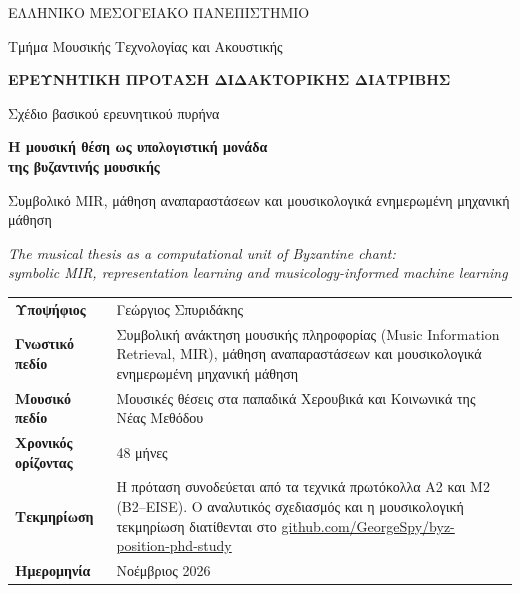 \documentclass[a4paper]{article}
\begin{document}
\fontsize{10.5}{12.6}\selectfont
\setlength{\parindent}{1em}

\hypersetup{pageanchor=false}
\begin{titlepage}
\centering
\vspace*{0.8cm}
{\sffamily\large ΕΛΛΗΝΙΚΟ ΜΕΣΟΓΕΙΑΚΟ ΠΑΝΕΠΙΣΤΗΜΙΟ\par}
{\sffamily Τμήμα Μουσικής Τεχνολογίας και Ακουστικής\par}
\vspace{1.7cm}
{\Large\bfseries\color{acc} ΕΡΕΥΝΗΤΙΚΗ ΠΡΟΤΑΣΗ ΔΙΔΑΚΤΟΡΙΚΗΣ ΔΙΑΤΡΙΒΗΣ\par}
\vspace{0.25cm}
{\large Σχέδιο βασικού ερευνητικού πυρήνα\par}
\vspace{1.1cm}
{\fontsize{22}{27}\selectfont\bfseries Η μουσική θέση ως υπολογιστική μονάδα\\[2pt] της βυζαντινής μουσικής\par}
\vspace{0.6cm}
{\Large Συμβολικό MIR, μάθηση αναπαραστάσεων και μουσικολογικά ενημερωμένη μηχανική μάθηση\par}
\vspace{0.5cm}
{\large\itshape The musical thesis as a computational unit of Byzantine chant:\\ symbolic MIR, representation learning and musicology-informed machine learning\par}
\vfill
\begin{tabularx}{0.94\linewidth}{@{}>{\bfseries}L{3.9cm}Y@{}}
Υποψήφιος & Γεώργιος Σπυριδάκης\\[7pt]
Γνωστικό πεδίο & Συμβολική ανάκτηση μουσικής πληροφορίας (Music Information Retrieval, MIR), μάθηση αναπαραστάσεων και μουσικολογικά ενημερωμένη μηχανική μάθηση\\[7pt]
Μουσικό πεδίο & Μουσικές θέσεις στα παπαδικά Χερουβικά και Κοινωνικά της Νέας Μεθόδου\\[7pt]
Χρονικός ορίζοντας & 48 μήνες\\[7pt]
Τεκμηρίωση & Η πρόταση συνοδεύεται από τα τεχνικά πρωτόκολλα Α2 και Μ2 (B2--EISE). Ο αναλυτικός σχεδιασμός και η μουσικολογική τεκμηρίωση διατίθενται στο \href{https://github.com/GeorgeSpy/byz-position-phd-study}{github.com/GeorgeSpy/byz-position-phd-study}\\[7pt]
Ημερομηνία & Νοέμβριος 2026
\end{tabularx}
\vspace{0.4cm}
\end{titlepage}
\setcounter{page}{1}
\hypersetup{pageanchor=true}
\end{document}
